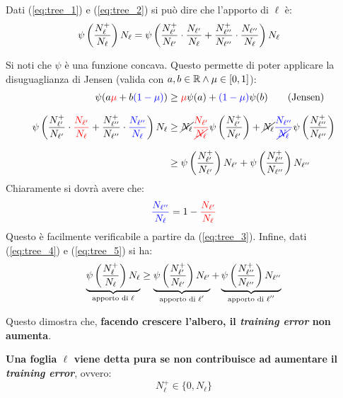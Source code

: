 Dati (\ref{eq:tree_1}) e (\ref{eq:tree_2}) si può dire che l'apporto di $\ell$ è:
\begin{align}
    \psi \left(\frac{N_{\ell}^+}{N_{\ell}}\right)N_{\ell} &=
        \psi \left(
            \frac{N_{\ell'}^+}{N_{\ell'}}\cdot\frac{N_{\ell'}}{N_{\ell}}
            +\frac{N_{\ell''}^+}{N_{\ell''}}\cdot\frac{N_{\ell''}}{N_{\ell}}
        \right)N_{\ell} \label{eq:tree_4}
\end{align}

Si noti che $\psi$ è una funzione concava. Questo permette di poter applicare la 
disuguaglianza di Jensen (valida con $ a,b \in \mathbb{R} \wedge \mu \in [0,1] $):
\begin{align}
    \psi(a{\color{red}\mu} + b{\color{blue}(1-\mu)}) &\geq {\color{red}\mu}\psi(a)+
        {\color{blue}(1-\mu)}\psi(b)\label{eq:tree_jensen} \tag{Jensen}\\[.7em]
    \psi \left(
            \frac{N_{\ell'}^+}{N_{\ell'}}\cdot{\color{red}\frac{N_{\ell'}}{N_{\ell}}}
            +\frac{N_{\ell''}^+}{N_{\ell''}}\cdot{\color{blue}\frac{N_{\ell''}}{N_{\ell}}}
        \right)N_{\ell} 
            &\geq 
            \cancel{N_{\ell}}{\color{red}\frac{N_{\ell'}}{\cancel{N_{\ell}}}}
            \psi\left(\frac{N_{\ell'}^+}{N_{\ell'}}\right) + \cancel{N_{\ell}}
            {\color{blue}\frac{N_{\ell''}}{\cancel{N_{\ell}}}}
            \psi\left(\frac{N_{\ell''}^+}{N_{\ell''}}\right) \notag\\[.7em]
            & \geq \psi\left(\frac{N_{\ell'}^+}{N_{\ell'}}\right)N_{\ell'} +
           \psi\left(\frac{N_{\ell''}^+}{N_{\ell''}}\right) N_{\ell''} \label{eq:tree_5}
\end{align}
Chiaramente si dovrà avere che:
$$ 
{\color{blue}\frac{N_{\ell''}}{N_{\ell}}} = 1-{\color{red}\frac{N_{\ell'}}{N_{\ell}}}
$$
Questo è facilmente verificabile a partire da (\ref{eq:tree_3}). Infine, dati 
(\ref{eq:tree_4}) e (\ref{eq:tree_5}) si ha:
$$
\underbrace{\psi \left(\frac{N_{\ell}^+}{N_{\ell}}\right)N_{\ell}}_{\text{apporto di $\ell$}}
\geq \underbrace{\psi\left(\frac{N_{\ell'}^+}{N_{\ell'}}\right)N_{\ell'}}_{\text{apporto di $\ell'$}} +
\underbrace{\psi\left(\frac{N_{\ell''}^+}{N_{\ell''}}\right) N_{\ell''}}_{\text{apporto di $\ell''$}}
$$

Questo dimostra che, \textbf{facendo crescere l'albero, il \textit{training error} non
aumenta}.

\textbf{Una foglia $\ell$ viene detta pura se non contribuisce ad aumentare il
\textit{training error}}, ovvero:
$$ N_{\ell}^+ \in \{0,N_{\ell}\} $$

